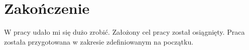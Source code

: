 
\chapter*{Zakończenie}

W pracy udało mi się dużo zrobić. Założony cel pracy został osiągnięty. Praca została przygotowana w zakresie zdefiniowanym na początku. 

\lipsum[17]

